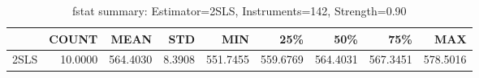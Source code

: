 \begin{table}[ht]
\centering
\caption{fstat summary: Estimator=2SLS, Instruments=142, Strength=0.90}
\begin{tabular}{lrrrrrrrr}
\toprule
 & COUNT & MEAN & STD & MIN & 25\% & 50\% & 75\% & MAX \\
\midrule
2SLS & 10.0000 & 564.4030 & 8.3908 & 551.7455 & 559.6769 & 564.4031 & 567.3451 & 578.5016 \\
\bottomrule
\end{tabular}
\end{table}
